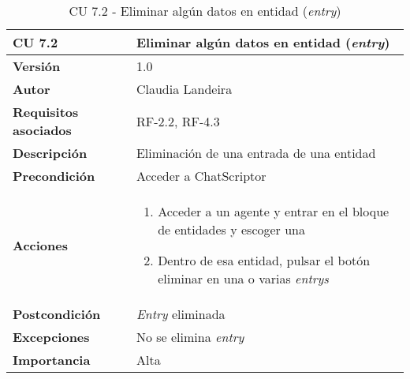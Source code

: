 \begin{table}[p]
	\centering
	\begin{tabularx}{\linewidth}{ p{} p{} }
		\toprule
		\textbf{CU 7.2}    & \textbf{Eliminar algún datos en entidad (\textit{entry}) }\\
		\toprule
		\textbf{Versión}              & 1.0    \\
		\textbf{Autor}                & Claudia Landeira \\
		\textbf{Requisitos asociados} & RF-2.2, RF-4.3\\
		\textbf{Descripción}          & Eliminación de una entrada de una entidad\\
		\textbf{Precondición}         & Acceder a ChatScriptor\\
		\textbf{Acciones}             &
		\begin{enumerate}
			\def\labelenumi{\arabic{enumi}.}
			\tightlist
                \item Acceder a un agente y entrar en el bloque de entidades y escoger una
                \item Dentro de esa entidad, pulsar el botón eliminar en una o varias \textit{entrys}
		\end{enumerate}\\
		\textbf{Postcondición}        & \textit{Entry} eliminada  \\
		\textbf{Excepciones}          & No se elimina \textit{entry} \\
		\textbf{Importancia}          & Alta \\
		\bottomrule
	\end{tabularx}
	\caption{CU 7.2 - Eliminar algún datos en entidad (\textit{entry})}
\end{table}

